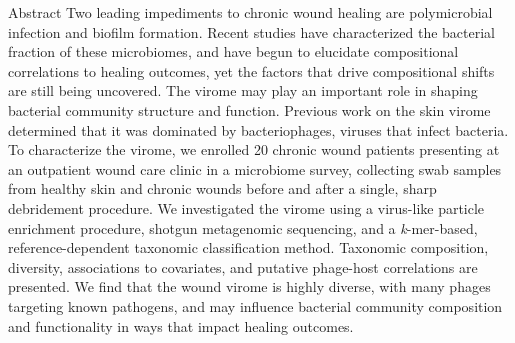 \documentclass[oneside,12pt,final]{sty/ucthesis-CA2012}
\begin{document}
\begin{mainmatter}
\begin{section}{Abstract}
Two leading impediments to chronic wound healing are polymicrobial infection and biofilm formation. Recent studies have characterized the bacterial fraction of these microbiomes, and have begun to elucidate compositional correlations to healing outcomes, yet the factors that drive compositional shifts are still being uncovered. The virome may play an important role in shaping bacterial community structure and function. Previous work on the skin virome determined that it was dominated by bacteriophages, viruses that infect bacteria. To characterize the virome, we enrolled 20 chronic wound patients presenting at an outpatient wound care clinic in a microbiome survey, collecting swab samples from healthy skin and chronic wounds before and after a single, sharp debridement procedure. We investigated the virome using a virus-like particle enrichment procedure, shotgun metagenomic sequencing, and a \textit{k}-mer-based, reference-dependent taxonomic classification method. Taxonomic composition, diversity, associations to covariates, and putative phage-host correlations are presented. We find that the wound virome is highly diverse, with many phages targeting known pathogens, and may influence bacterial community composition and functionality in ways that impact healing outcomes.
\end{section}


\end{mainmatter}
\end{document}
